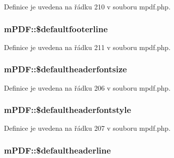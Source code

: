Definice je uvedena na řádku 210 v souboru mpdf.\-php.

\hypertarget{classm_p_d_f_ae03f4fb84dc29e831e3ea606fcf2db34}{
\subsubsection[{\$defaultfooterline}]{\setlength{\rightskip}{0pt plus 5cm}m\-P\-D\-F\-::\$defaultfooterline}}\label{classm_p_d_f_ae03f4fb84dc29e831e3ea606fcf2db34}


Definice je uvedena na řádku 211 v souboru mpdf.\-php.

\hypertarget{classm_p_d_f_af2f12b6b0fbf931fcb057e48ce7f873a}{
\subsubsection[{\$defaultheaderfontsize}]{\setlength{\rightskip}{0pt plus 5cm}m\-P\-D\-F\-::\$defaultheaderfontsize}}\label{classm_p_d_f_af2f12b6b0fbf931fcb057e48ce7f873a}


Definice je uvedena na řádku 206 v souboru mpdf.\-php.

\hypertarget{classm_p_d_f_a19fc36fef79cbc8a4f3c210519e9ec28}{
\subsubsection[{\$defaultheaderfontstyle}]{\setlength{\rightskip}{0pt plus 5cm}m\-P\-D\-F\-::\$defaultheaderfontstyle}}\label{classm_p_d_f_a19fc36fef79cbc8a4f3c210519e9ec28}


Definice je uvedena na řádku 207 v souboru mpdf.\-php.

\hypertarget{classm_p_d_f_a479a24db329cf97be8b1b6fb2127298e}{
\subsubsection[{\$defaultheaderline}]{\setlength{\rightskip}{0pt plus 5cm}m\-P\-D\-F\-::\$defaultheaderline}}\label{classm_p_d_f_a479a24db329cf97be8b1b6fb2127298e}


